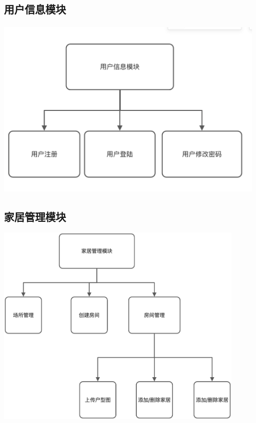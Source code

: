 \documentclass[utf8,a4paper,20pt]{article}
\begin{document}
\subsection{用户信息模块}
\includegraphics[width=\linewidth,height=9cm]{./assets/user.png}
\subsection{家居管理模块}
\includegraphics[width=\linewidth,height=10cm]{./assets/jiajuguanli.jpg}
\end{document}
